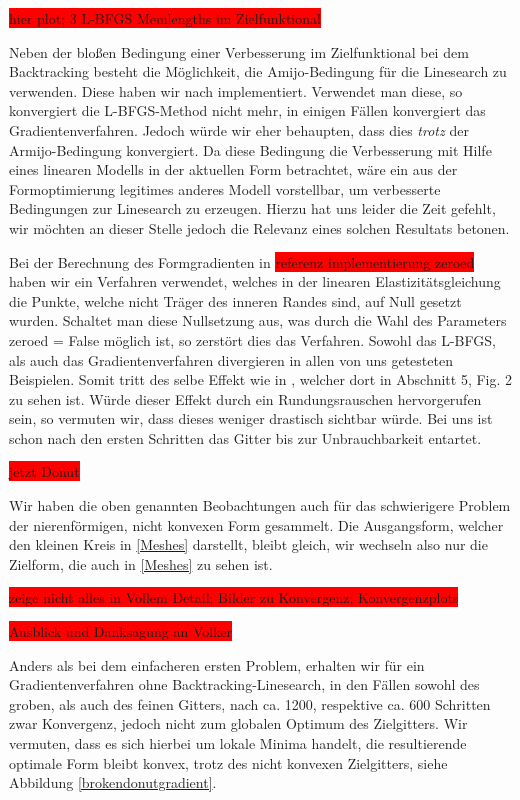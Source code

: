 \colorbox{red}{hier plot; 3 L-BFGS Memlengths im Zielfunktional}

Neben der bloßen Bedingung einer Verbesserung im Zielfunktional bei dem Backtracking besteht die Möglichkeit, die Amijo-Bedingung für die Linesearch zu verwenden. Diese haben wir nach \cite{Nocedal} implementiert. Verwendet man diese, so konvergiert die L-BFGS-Method nicht mehr, in einigen Fällen konvergiert das Gradientenverfahren. Jedoch würde wir eher behaupten, dass dies \textit{trotz} der Armijo-Bedingung konvergiert. Da diese Bedingung die Verbesserung mit Hilfe eines linearen Modells in der aktuellen Form betrachtet, wäre ein aus der Formoptimierung legitimes anderes Modell vorstellbar, um verbesserte Bedingungen zur Linesearch zu erzeugen. Hierzu hat uns leider die Zeit gefehlt, wir möchten an dieser Stelle jedoch die Relevanz eines solchen Resultats betonen. 

Bei der Berechnung des Formgradienten in \colorbox{red}{referenz implementierung zeroed} haben wir ein Verfahren verwendet, welches in der linearen Elastizitätsgleichung die Punkte, welche nicht Träger des inneren Randes sind, auf Null gesetzt wurden. Schaltet man diese Nullsetzung aus, was durch die Wahl des Parameters \textsf{zeroed = False} möglich ist, so zerstört dies das Verfahren. Sowohl das L-BFGS, als auch das Gradientenverfahren divergieren in allen von uns getesteten Beispielen. Somit tritt des selbe Effekt wie in \cite{bfgs2}, welcher dort in Abschnitt 5, Fig. 2 zu sehen ist. Würde dieser Effekt durch ein Rundungsrauschen hervorgerufen sein, so vermuten wir, dass dieses weniger drastisch sichtbar würde. Bei uns ist schon nach den ersten Schritten das Gitter bis zur Unbrauchbarkeit entartet.

\colorbox{red}{jetzt Donut}

Wir haben die oben genannten Beobachtungen auch für das schwierigere Problem der nierenförmigen, nicht konvexen Form gesammelt. Die Ausgangsform, welcher den kleinen Kreis in \ref{Meshes} darstellt, bleibt gleich, wir wechseln also nur die Zielform, die auch in \ref{Meshes} zu sehen ist. 


\colorbox{red}{zeige nicht alles in Vollem Detail; Bilder zu Konvergenz; Konvergenzplots}

\colorbox{red}{Ausblick und Danksagung an Volker}

Anders als bei dem einfacheren ersten Problem, erhalten wir für ein Gradientenverfahren ohne Backtracking-Linesearch, in den Fällen sowohl des groben, als auch des feinen Gitters, nach ca. 1200, respektive ca. 600 Schritten zwar Konvergenz, jedoch nicht zum globalen Optimum des Zielgitters. Wir vermuten, dass es sich hierbei um lokale Minima handelt, die resultierende optimale Form bleibt konvex, trotz des nicht konvexen Zielgitters, siehe Abbildung
\ref{brokendonutgradient}.

